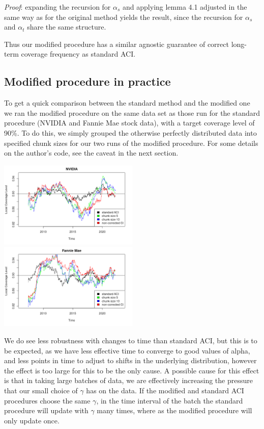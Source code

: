 \documentclass[
]{article}
\begin{document}
\emph{Proof}: expanding the recursion for \(\alpha_s\) and applying
lemma 4.1 adjusted in the same way as for the original method yields the
result, since the recursion for \(\alpha_s\) and \(\alpha_t\) share the
same structure.

Thus our modified procedure has a similar agnostic guarantee of correct
long-term coverage frequency as standard ACI.

\hypertarget{modified-procedure-in-practice}{%
\subsection{Modified procedure in
practice}\label{modified-procedure-in-practice}}

To get a quick comparison between the standard method and the modified
one we ran the modified procedure on the same data set as those run for
the standard procedure (NVIDIA and Fannie Mae stock data), with a target
coverage level of 90\%. To do this, we simply grouped the otherwise
perfectly distributed data into specified chunk sizes for our two runs
of the modified procedure. For some details on the author's code, see
the caveat in the next section.

\includegraphics[width=0.5\textwidth,height=\textheight]{./images/1nvidiamodified.png}
\includegraphics[width=0.5\textwidth,height=\textheight]{./images/2fmmodified.png}

We do see less robustness with changes to time than standard ACI, but
this is to be expected, as we have less effective time to converge to
good values of alpha, and less points in time to adjust to shifts in the
underlying distribution, however the effect is too large for this to be
the only cause. A possible cause for this effect is that in taking large
batches of data, we are effectively increasing the pressure that our
small choice of \(\gamma\) has on the data. If the modified and standard
ACI procedures choose the same \(\gamma\), in the time interval of the
batch the standard procedure will update with \(\gamma\) many times,
where as the modified procedure will only update once.
\end{document}
